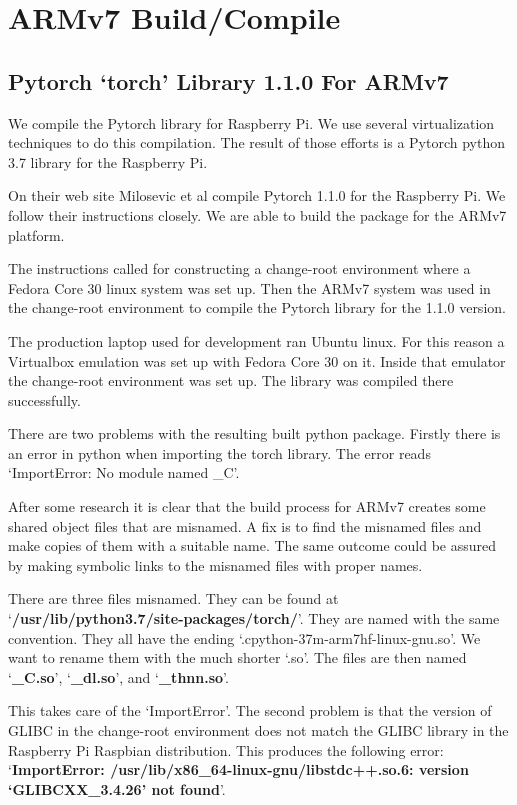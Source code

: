 \section{ARMv7 Build/Compile}

\subsection{Pytorch `torch' Library 1.1.0 For ARMv7}
We compile the Pytorch library for Raspberry Pi. We use several virtualization techniques to do this compilation. The result of those efforts is a Pytorch python 3.7 library for the Raspberry Pi.

On their web site Milosevic et al \cite{2018Milosevic} compile Pytorch 1.1.0 for the Raspberry Pi. We follow their instructions closely. We are able to build the package for the ARMv7 platform.

The instructions called for constructing a change-root environment where a Fedora Core 30 linux system was set up. Then the ARMv7 system was used in the change-root environment to compile the Pytorch library for the 1.1.0 version.

The production laptop used for development ran Ubuntu linux. For this reason a Virtualbox emulation was set up with Fedora Core 30 on it. Inside that emulator the change-root environment was set up. The library was compiled there successfully. 

There are two problems with the resulting built python package. Firstly there is an error in python when importing the torch library. The error reads `ImportError: No module named \_C'. 

After some research it is clear that the build process for ARMv7 creates some shared object files that are misnamed. A fix is to find the misnamed files and make copies of them with a suitable name. The same outcome could be assured by making symbolic links to the misnamed files with proper names.

There are three files misnamed. They can be found at `\textbf{/usr/lib/python3.7/site-packages/torch/}'. They are named with the same convention. They all have the ending `.cpython-37m-arm7hf-linux-gnu.so'. We want to rename them with the much shorter `.so'. The files are then named `\textbf{\_C.so}', `\textbf{\_dl.so}', and `\textbf{\_thnn.so}'.

This takes care of the `ImportError'. The second problem is that the version of GLIBC in the change-root environment does not match the GLIBC library in the Raspberry Pi Raspbian distribution. This produces the following error: `\textbf{ImportError: /usr/lib/x86\_64-linux-gnu/libstdc++.so.6: version `GLIBCXX\_3.4.26' not found}'.

